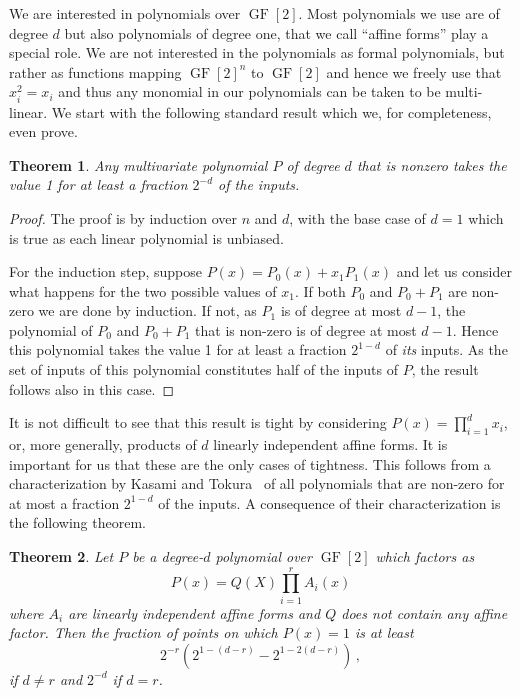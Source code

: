 \documentclass[10pt]{article}
\newtheorem{theorem}{Theorem}[section]
\theoremstyle{definition}
\numberwithin{equation}{section}
\newcommand{\GF}{\operatorname{GF}}
\begin{document}
We are interested in polynomials over $\GF[2]$.
Most polynomials we use are of
degree $d$ but also polynomials of degree one, that
we call ``affine forms'' play a special role.
We are not interested in the polynomials as formal
polynomials, but rather as functions mapping
$\GF[2]^n$ to $\GF[2]$ and hence we freely
use that $x_i^2=x_i$ and thus any
monomial in our polynomials can be taken to be multi-linear.
We start with the following standard result which we,
for completeness, even prove.

\begin{theorem}\label{thm basic deg d}
Any multivariate polynomial $P$ of degree
$d$ that is nonzero takes the
value 1 for at least a fraction
$2^{-d}$ of the inputs.
\end{theorem}


\begin{proof}
The proof is by induction over $n$ and $d$,
with the base case of $d=1$ which is true
as each linear polynomial is unbiased.

For the induction step, suppose $P(x)=P_0(x)+x_1 P_1(x)$
and let us consider what happens for the two possible
values of $x_1$.
If both $P_0$ and $P_0+P_1$ are non-zero we are
done by induction.  If not, as $P_1$ is of degree
at most $d-1$, the polynomial of $P_0$ and $P_0+P_1$ 
that is non-zero is of degree at most $d-1$.
Hence this polynomial takes the value 1 for at least a fraction $2^{1-d}$
of \emph{its} inputs.  As the set of inputs of this
polynomial constitutes half of the inputs of $P$,
the result follows also in this case.
\end{proof}

It is not difficult to see that this result is
tight by considering $P(x)=\prod_{i=1}^dx_i$,
or, more generally, products of $d$ linearly independent
affine forms.  
It is important for us
that these are the only cases of tightness.
This follows from a characterization by Kasami
and Tokura~\cite{kt70} of all polynomials
that are non-zero for at most a fraction
$2^{1-d}$ of the inputs.  
A consequence of their characterization is
the following theorem. 

\begin{theorem}\label{basic theorem}
Let $P$ be a %
degree-$d$
polynomial
over $\GF[2]$ which factors
as
$$P(x)= Q(X) \prod_{i=1}^r A_i (x) 
$$
where $A_i$ are linearly independent
affine forms and $Q$ does not
contain any affine factor.
Then the fraction of points on which $P(x)=1$
is at least
$$
2^{-r} (2^{1-(d-r)}-2^{1-2(d-r)})\,,$$
if $d\not =r$ and $2^{-d}$ if $d=r$.
\end{theorem}
\end{document}
